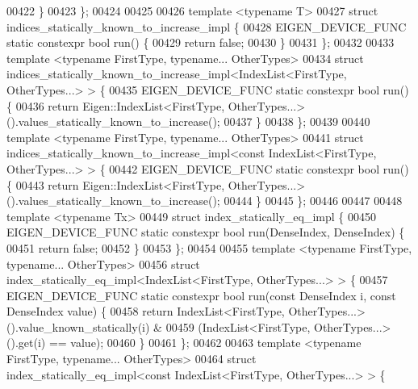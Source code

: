 \begin{DoxyCode}
00422   \}
00423 \};
00424 
00425 
00426 \textcolor{keyword}{template} <\textcolor{keyword}{typename} T>
00427 \textcolor{keyword}{struct }indices\_statically\_known\_to\_increase\_impl \{
00428   EIGEN\_DEVICE\_FUNC \textcolor{keyword}{static} constexpr \textcolor{keywordtype}{bool} run() \{
00429     \textcolor{keywordflow}{return} \textcolor{keyword}{false};
00430   \}
00431 \};
00432 
00433 \textcolor{keyword}{template} <\textcolor{keyword}{typename} FirstType, \textcolor{keyword}{typename}... OtherTypes>
00434   \textcolor{keyword}{struct }indices\_statically\_known\_to\_increase\_impl<IndexList<FirstType, OtherTypes...> > \{
00435   EIGEN\_DEVICE\_FUNC \textcolor{keyword}{static} constexpr \textcolor{keywordtype}{bool} run() \{
00436     \textcolor{keywordflow}{return} Eigen::IndexList<FirstType, OtherTypes...>().values\_statically\_known\_to\_increase();
00437   \}
00438 \};
00439 
00440 \textcolor{keyword}{template} <\textcolor{keyword}{typename} FirstType, \textcolor{keyword}{typename}... OtherTypes>
00441   \textcolor{keyword}{struct }indices\_statically\_known\_to\_increase\_impl<const IndexList<FirstType, OtherTypes...> > \{
00442   EIGEN\_DEVICE\_FUNC \textcolor{keyword}{static} constexpr \textcolor{keywordtype}{bool} run() \{
00443     \textcolor{keywordflow}{return} Eigen::IndexList<FirstType, OtherTypes...>().values\_statically\_known\_to\_increase();
00444   \}
00445 \};
00446 
00447 
00448 \textcolor{keyword}{template} <\textcolor{keyword}{typename} Tx>
00449 \textcolor{keyword}{struct }index\_statically\_eq\_impl \{
00450   EIGEN\_DEVICE\_FUNC \textcolor{keyword}{static} constexpr \textcolor{keywordtype}{bool} run(DenseIndex, DenseIndex) \{
00451     \textcolor{keywordflow}{return} \textcolor{keyword}{false};
00452   \}
00453 \};
00454 
00455 \textcolor{keyword}{template} <\textcolor{keyword}{typename} FirstType, \textcolor{keyword}{typename}... OtherTypes>
00456 \textcolor{keyword}{struct }index\_statically\_eq\_impl<IndexList<FirstType, OtherTypes...> > \{
00457   EIGEN\_DEVICE\_FUNC \textcolor{keyword}{static} constexpr \textcolor{keywordtype}{bool} run(\textcolor{keyword}{const} DenseIndex i, \textcolor{keyword}{const} DenseIndex value) \{
00458     \textcolor{keywordflow}{return} IndexList<FirstType, OtherTypes...>().value\_known\_statically(i) &
00459         (IndexList<FirstType, OtherTypes...>().\textcolor{keyword}{get}(i) == value);
00460   \}
00461 \};
00462 
00463 \textcolor{keyword}{template} <\textcolor{keyword}{typename} FirstType, \textcolor{keyword}{typename}... OtherTypes>
00464 \textcolor{keyword}{struct }index\_statically\_eq\_impl<const IndexList<FirstType, OtherTypes...> > \{

\end{DoxyCode}
